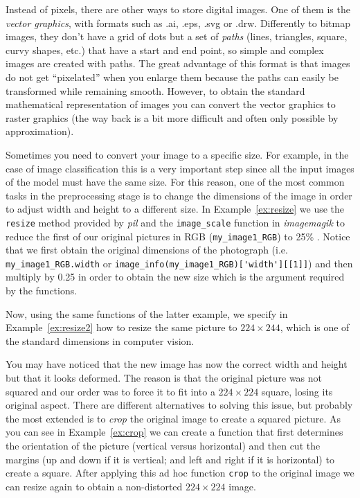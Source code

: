 
Instead of pixels, there are other ways to store digital images. One of them is the \textit{vector graphics}, with formats such as .ai, .eps, .svg or .drw. Differently to bitmap images, they don't have a grid of dots but a set of \textit{paths} (lines, triangles, square, curvy shapes, etc.) that have a start and end point, so  simple and complex images are created with paths. The great advantage of this format is that images do not get  ``pixelated'' when you enlarge them because the paths can easily be transformed 	while remaining smooth. However, to obtain the standard mathematical representation of images you can convert the vector graphics to raster graphics (the way back is a bit more difficult and often only possible by approximation).

Sometimes you need to convert your image to a specific size. For example, in the case of image classification this is a very important step since all the input images of the model must have the same size. For this reason, one of the most common tasks in the preprocessing stage is to change the dimensions of the image in order to adjust width and height to a different size. In Example~\ref{ex:resize} we use the \texttt{resize} method provided by \emph{pil} and the \texttt{image\_scale} function in \emph{imagemagik} to reduce the first of our original pictures in RGB (\texttt{my\_image1\_RGB}) to 25\% . Notice that we first obtain the original dimensions of the photograph
(i.e. \texttt{my\_image1\_RGB.width} or \verb|image_info(my_image1_RGB)['width'][[1]]|) and then multiply by 0.25 in order to obtain the new size which is the argument required by the functions.


Now, using the same functions of the latter example, we specify in Example~\ref{ex:resize2} how to resize the same picture to $224 \times 244$, which is one of the standard dimensions in computer vision.


You may have noticed that the new image has now the correct width and height but that it looks deformed. The reason is that the original picture was not squared and our order was to force it to fit  into a $224 \times 224$ square, losing its original aspect. There are different alternatives to solving this issue, but probably the most extended is to \textit{crop} the original image to create a squared picture. As you can see in Example~\ref{ex:crop} we can create a function that first determines the orientation of the picture (vertical versus horizontal) and then cut the margins  (up and down if it is vertical; and left and right if it is horizontal) to create a square. After applying this ad hoc function \texttt{crop} to the original image we can resize again to obtain a non-distorted $224 \times 224$ image.

